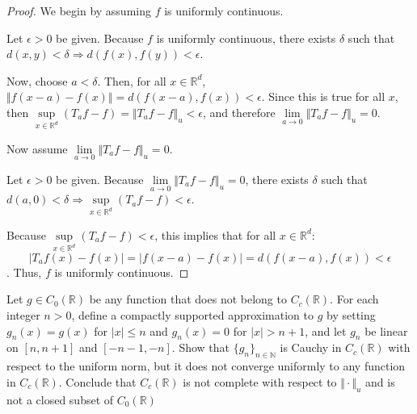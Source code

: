 \documentclass[10pt]{article}
\newenvironment{problem}[2][Problem]{\begin{trivlist}
\item[\hskip \labelsep {\bfseries #1}\hskip \labelsep {\bfseries #2.}]}{\end{trivlist}}
\begin{document}
\begin{proof}[Proof]
We begin by assuming $f$ is uniformly continuous.

Let $\epsilon > 0$ be given. Because $f$ is uniformly continuous, there exists $\delta$ such that $d(x,y) < \delta \Rightarrow d(f(x),f(y)) < \epsilon$.

Now, choose $a < \delta$. Then, for all $x \in \mathbb{R}^d$, $\Vert f(x-a) - f(x) \Vert  =  d(f(x-a),f(x)) < \epsilon $. Since this is true for all $x$, then $ \sup\limits_{x \in \mathbb{R}^d} ( T_a f - f ) = \Vert T_a f - f \Vert_u < \epsilon$, and therefore $ \lim\limits_{a \to 0} \Vert T_a f - f \Vert_u = 0$.

Now assume $ \lim\limits_{a \to 0} \Vert T_a f - f \Vert_u = 0$.

Let $\epsilon > 0$ be given. Because  $ \lim\limits_{a \to 0} \Vert T_a f - f \Vert_u = 0$, there exists $\delta$ such that $d(a,0) < \delta \Rightarrow \sup\limits_{x \in \mathbb{R}^d} ( T_a f - f ) < \epsilon$.

Because $\sup\limits_{x \in \mathbb{R}^d} ( T_a f - f ) < \epsilon$, this implies that for all $x \in \mathbb{R}^d$:
$$|T_a f(x) - f(x) | = | f(x-a) - f(x) | = d(f(x-a),f(x))  < \epsilon $$. Thus, $f$ is uniformly continuous.

\end{proof}

\begin{problem}{1.3.8}
Let $g \in C_0(\mathbb{R})$ be any function that does not belong to $C_c(\mathbb{R})$. For each integer $n > 0$, define a compactly supported approximation to $g$ by setting $g_n(x) = g(x)$ for $|x| \leq n$ and $g_n(x) = 0$ for $|x| > n+1$, and let $g_n$ be linear on $[n,n+1]$ and $[-n-1, -n]$. Show that $\{g_n\}_{n \in \mathbb{N}}$ is Cauchy in $C_c(\mathbb{R})$ with respect to the uniform norm, but it does not converge uniformly to any function in $C_c(\mathbb{R})$. Conclude that $C_c(\mathbb{R})$ is not complete with respect to $\Vert \cdot \Vert_u$ and is not a closed subset of $C_0(\mathbb{R})$
\end{problem}
\end{document}
